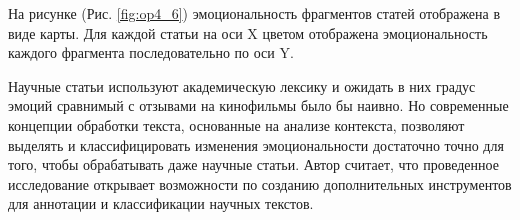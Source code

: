 На рисунке (Рис. \ref{fig:op4_6}) эмоциональность фрагментов статей отображена в виде карты. Для каждой статьи на оси X цветом отображена эмоциональность каждого фрагмента последовательно по оси Y. 

Научные статьи используют академическую лексику и ожидать в них градус эмоций сравнимый с отзывами на кинофильмы было бы наивно. Но современные концепции обработки текста, основанные на анализе контекста, позволяют выделять и классифицировать изменения эмоциональности достаточно точно для того, чтобы обрабатывать даже научные статьи. Автор считает, что проведенное исследование открывает возможности по созданию дополнительных инструментов для аннотации и классификации научных текстов.

